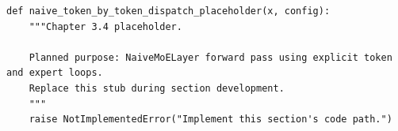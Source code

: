 \begin{lstlisting}[style=bookpython,caption={Planned code placeholder for naive token by token dispatch.},label={lst:ch03-naive-token-by-token-dispatch}]
def naive_token_by_token_dispatch_placeholder(x, config):
    """Chapter 3.4 placeholder.

    Planned purpose: NaiveMoELayer forward pass using explicit token and expert loops.
    Replace this stub during section development.
    """
    raise NotImplementedError("Implement this section's code path.")
\end{lstlisting}
